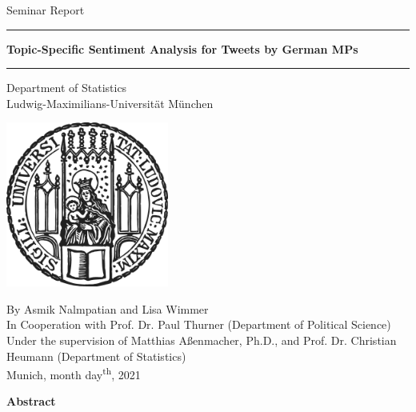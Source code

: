 \documentclass[12pt]{article}
\begin{document}


 
\begin{titlepage}
\begin{center}
    
\LARGE
Seminar Report
    
\vspace{0.5cm}
      
\rule{\textwidth}{1.5pt}
\LARGE 
\textbf{Topic-Specific Sentiment Analysis for Tweets by German MPs}
\rule{\textwidth}{1.5pt}
   
\vspace{0.5cm}
      
\large
Department of Statistics \\
Ludwig-Maximilians-Universität München
      
\vspace{3.5cm}

\includegraphics[width = 0.4\textwidth]{figures/sigillum.png}

\vspace{3.5cm}

\large
By Asmik Nalmpatian and Lisa Wimmer \\
In Cooperation with Prof. Dr. Paul Thurner (Department of Political Science)
Under the supervision of Matthias Aßenmacher, Ph.D., and Prof. Dr. Christian 
Heumann (Department of Statistics) \\
Munich, month day\textsuperscript{th}, 2021

\end{center}
\end{titlepage}


\newpage

\Large
\noindent
\textbf{Abstract}
\vspace{0.5cm} \\
\noindent
\normalsize

\newpage
\end{document}
